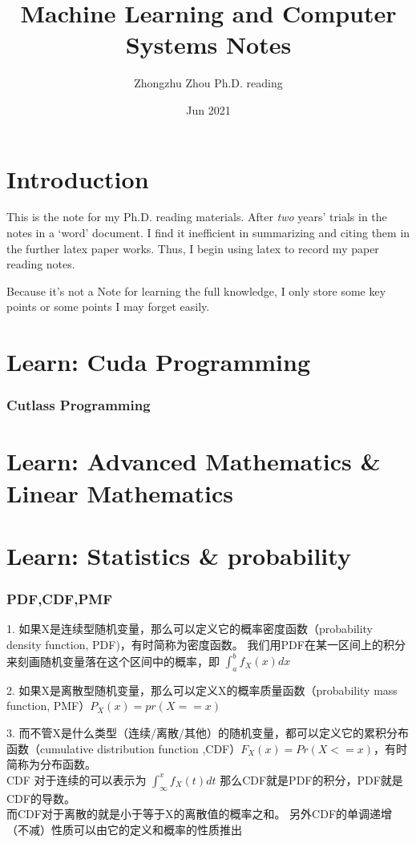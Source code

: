 \documentclass[UTF8]{article}
\title{Machine Learning and Computer Systems Notes}
\author{Zhongzhu Zhou Ph.D. reading}
\date{Jun 2021}
\begin{document}
\maketitle

\tableofcontents

\section{Introduction}
This is the note for my Ph.D. reading materials. After \emph{two} years' trials in the notes in a `word' document. I find it inefficient in summarizing and citing them in the further latex paper works. Thus, I begin using latex to record my paper reading notes.

Because it's not a Note for learning the full knowledge, I only store some key points or some points I may forget easily.
\section{Learn: Cuda Programming}
\subsubsection{Cutlass Programming}

\section{Learn: Advanced Mathematics \& Linear Mathematics}
\section{Learn: Statistics \& probability}
\subsubsection{PDF,CDF,PMF}
1. 如果X是连续型随机变量，那么可以定义它的概率密度函数（probability density function, PDF)，有时简称为密度函数。 我们用PDF在某一区间上的积分来刻画随机变量落在这个区间中的概率，即 $\int^b_a f_X(x) dx$ 

2. 如果X是离散型随机变量，那么可以定义X的概率质量函数（probability mass function, PMF）$P_X(x) = pr(X == x)$

3. 而不管X是什么类型（连续/离散/其他）的随机变量，都可以定义它的累积分布函数（cumulative distribution function ,CDF）$F_X(x) = Pr(X <= x)$，有时简称为分布函数。 \\CDF 对于连续的可以表示为 $\int_{\infty}^x f_X(t) dt$ 那么CDF就是PDF的积分，PDF就是CDF的导数。 \\而CDF对于离散的就是小于等于X的离散值的概率之和。 另外CDF的单调递增（不减）性质可以由它的定义和概率的性质推出
\end{document}
